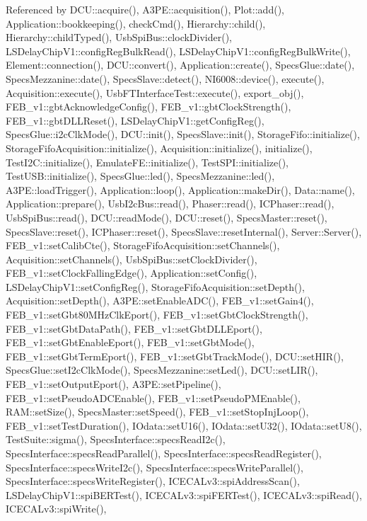 Referenced by D\+C\+U\+::acquire(), A3\+P\+E\+::acquisition(), Plot\+::add(), Application\+::bookkeeping(), check\+Cmd(), Hierarchy\+::child(), Hierarchy\+::child\+Typed(), Usb\+Spi\+Bus\+::clock\+Divider(), L\+S\+Delay\+Chip\+V1\+::config\+Reg\+Bulk\+Read(), L\+S\+Delay\+Chip\+V1\+::config\+Reg\+Bulk\+Write(), Element\+::connection(), D\+C\+U\+::convert(), Application\+::create(), Specs\+Glue\+::date(), Specs\+Mezzanine\+::date(), Specs\+Slave\+::detect(), N\+I6008\+::device(), execute(), Acquisition\+::execute(), Usb\+F\+T\+Interface\+Test\+::execute(), export\+\_\+obj(), F\+E\+B\+\_\+v1\+::gbt\+Acknowledge\+Config(), F\+E\+B\+\_\+v1\+::gbt\+Clock\+Strength(), F\+E\+B\+\_\+v1\+::gbt\+D\+L\+L\+Reset(), L\+S\+Delay\+Chip\+V1\+::get\+Config\+Reg(), Specs\+Glue\+::i2c\+Clk\+Mode(), D\+C\+U\+::init(), Specs\+Slave\+::init(), Storage\+Fifo\+::initialize(), Storage\+Fifo\+Acquisition\+::initialize(), Acquisition\+::initialize(), initialize(), Test\+I2\+C\+::initialize(), Emulate\+F\+E\+::initialize(), Test\+S\+P\+I\+::initialize(), Test\+U\+S\+B\+::initialize(), Specs\+Glue\+::led(), Specs\+Mezzanine\+::led(), A3\+P\+E\+::load\+Trigger(), Application\+::loop(), Application\+::make\+Dir(), Data\+::name(), Application\+::prepare(), Usb\+I2c\+Bus\+::read(), Phaser\+::read(), I\+C\+Phaser\+::read(), Usb\+Spi\+Bus\+::read(), D\+C\+U\+::read\+Mode(), D\+C\+U\+::reset(), Specs\+Master\+::reset(), Specs\+Slave\+::reset(), I\+C\+Phaser\+::reset(), Specs\+Slave\+::reset\+Internal(), Server\+::\+Server(), F\+E\+B\+\_\+v1\+::set\+Calib\+Cte(), Storage\+Fifo\+Acquisition\+::set\+Channels(), Acquisition\+::set\+Channels(), Usb\+Spi\+Bus\+::set\+Clock\+Divider(), F\+E\+B\+\_\+v1\+::set\+Clock\+Falling\+Edge(), Application\+::set\+Config(), L\+S\+Delay\+Chip\+V1\+::set\+Config\+Reg(), Storage\+Fifo\+Acquisition\+::set\+Depth(), Acquisition\+::set\+Depth(), A3\+P\+E\+::set\+Enable\+A\+D\+C(), F\+E\+B\+\_\+v1\+::set\+Gain4(), F\+E\+B\+\_\+v1\+::set\+Gbt80\+M\+Hz\+Clk\+Eport(), F\+E\+B\+\_\+v1\+::set\+Gbt\+Clock\+Strength(), F\+E\+B\+\_\+v1\+::set\+Gbt\+Data\+Path(), F\+E\+B\+\_\+v1\+::set\+Gbt\+D\+L\+L\+Eport(), F\+E\+B\+\_\+v1\+::set\+Gbt\+Enable\+Eport(), F\+E\+B\+\_\+v1\+::set\+Gbt\+Mode(), F\+E\+B\+\_\+v1\+::set\+Gbt\+Term\+Eport(), F\+E\+B\+\_\+v1\+::set\+Gbt\+Track\+Mode(), D\+C\+U\+::set\+H\+I\+R(), Specs\+Glue\+::set\+I2c\+Clk\+Mode(), Specs\+Mezzanine\+::set\+Led(), D\+C\+U\+::set\+L\+I\+R(), F\+E\+B\+\_\+v1\+::set\+Output\+Eport(), A3\+P\+E\+::set\+Pipeline(), F\+E\+B\+\_\+v1\+::set\+Pseudo\+A\+D\+C\+Enable(), F\+E\+B\+\_\+v1\+::set\+Pseudo\+P\+M\+Enable(), R\+A\+M\+::set\+Size(), Specs\+Master\+::set\+Speed(), F\+E\+B\+\_\+v1\+::set\+Stop\+Inj\+Loop(), F\+E\+B\+\_\+v1\+::set\+Test\+Duration(), I\+Odata\+::set\+U16(), I\+Odata\+::set\+U32(), I\+Odata\+::set\+U8(), Test\+Suite\+::sigma(), Specs\+Interface\+::specs\+Read\+I2c(), Specs\+Interface\+::specs\+Read\+Parallel(), Specs\+Interface\+::specs\+Read\+Register(), Specs\+Interface\+::specs\+Write\+I2c(), Specs\+Interface\+::specs\+Write\+Parallel(), Specs\+Interface\+::specs\+Write\+Register(), I\+C\+E\+C\+A\+Lv3\+::spi\+Address\+Scan(), L\+S\+Delay\+Chip\+V1\+::spi\+B\+E\+R\+Test(), I\+C\+E\+C\+A\+Lv3\+::spi\+F\+E\+R\+Test(), I\+C\+E\+C\+A\+Lv3\+::spi\+Read(), I\+C\+E\+C\+A\+Lv3\+::spi\+Write(), 